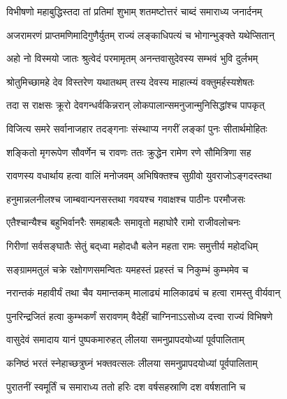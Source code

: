 \twolineshloka
{विभीषणो महाबुद्धिस्तदा तां प्रतिमां शुभाम्}
{शतमष्टोत्तरं चाब्दं समाराध्य जनार्दनम्} %

\twolineshloka
{अजरामरणं प्राप्तमणिमादिगुणैर्युतम्}
{राज्यं लङ्काधिपत्यं च भोगान्भुङ्क्ते यथेप्सितान्} %


\twolineshloka
{अहो नो विस्मयो जातः श्रुत्वेदं परमामृतम्}
{अनन्तवासुदेवस्य सम्भवं भुवि दुर्लभम्} %

\twolineshloka
{श्रोतुमिच्छामहे देव विस्तरेण यथातथम्}
{तस्य देवस्य माहात्म्यं वक्तुमर्हस्यशेषतः} %



\twolineshloka
{तदा स राक्षसः क्रूरो देवगन्धर्वकिन्नरान्}
{लोकपालान्समनुजान्मुनिसिद्धांश्च पापकृत्} %

\twolineshloka
{विजित्य समरे सर्वानाजहार तदङ्गनाः}
{संस्थाप्य नगरीं लङ्कां पुनः सीतार्थमोहितः} %

\twolineshloka
{शङ्कितो मृगरूपेण सौवर्णेन च रावणः}
{ततः क्रुद्धेन रामेण रणे सौमित्रिणा सह} %

\twolineshloka
{रावणस्य वधार्थाय हत्वा वालिं मनोजवम्}
{अभिषिक्तश्च सुग्रीवो युवराजोऽङ्गदस्तथा} %

\twolineshloka
{हनुमान्नलनीलश्च जाम्बवान्पनसस्तथा}
{गवयश्च गवाक्षश्च पाठीनः परमौजसः} %

\twolineshloka
{एतैश्चान्यैश्च बहुभिर्वानरैः समहाबलैः}
{समावृतो महाघोरै रामो राजीवलोचनः} %

\twolineshloka
{गिरीणां सर्वसङ्घातैः सेतुं बद्‌ध्वा महोदधौ}
{बलेन महता रामः समुत्तीर्य महोदधिम्} %

\twolineshloka
{सङ्ग्राममतुलं चक्रे रक्षोगणसमन्वितः}
{यमहस्तं प्रहस्तं च निकुम्भं कुम्भमेव च} %

\twolineshloka
{नरान्तकं महावीर्यं तथा चैव यमान्तकम्}
{मालाढ्यं मालिकाढ्यं च हत्वा रामस्तु वीर्यवान्} %

\twolineshloka
{पुनरिन्द्रजितं हत्वा कुम्भकर्णं सरावणम्}
{वैदेहीं चाग्निनाऽऽसोध्य दत्त्वा राज्यं विभिषणे} %

\twolineshloka
{वासुदेवं समादाय यानं पुष्पकमारुहत्}
{लीलया समनुप्रापदयोध्यां पूर्वपालिताम्} %

\twolineshloka
{कनिष्ठं भरतं स्नेहाच्छत्रुघ्नं भक्तवत्सलः}
{लीलया समनुप्रापदयोध्यां पूर्वपालिताम्} %

\twolineshloka
{पुरातनीं स्वमूर्तिं च समाराध्य ततो हरिः}
{दश वर्षसहस्राणि दश वर्षशतानि च} %


